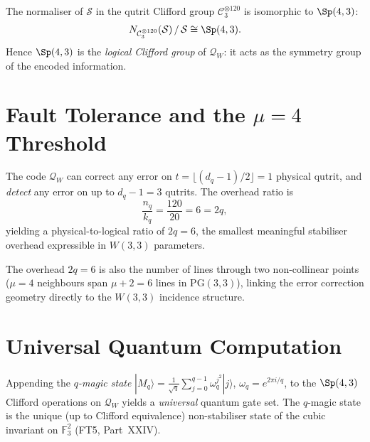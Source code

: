 \begin{theorem}[Stabiliser group $= \Sp(4,3)$]
\label{thm:stab_sp43}
The normaliser of $\mathcal{S}$ in the qutrit Clifford group
$\mathcal{C}_3^{\otimes 120}$ is isomorphic to $\Sp(4,3)$:
\begin{equation}
  N_{\mathcal{C}_3^{\otimes 120}}(\mathcal{S})
  \,/\,\mathcal{S}
  \cong \Sp(4,3).
  \label{eq:normaliser}
\end{equation}
Hence $\Sp(4,3)$ is the \emph{logical Clifford group} of
$\mathcal{Q}_W$: it acts as the symmetry group of the encoded
information.
\end{theorem}

\section{\texorpdfstring{Fault Tolerance and the $\mu=4$ Threshold}{Fault Tolerance and the mu=4 Threshold}}
\label{sec:fault_tolerance}

\begin{theorem}
\label{thm:fault_tol}
The code $\mathcal{Q}_W$ can correct any error on
$t=\lfloor(d_q-1)/2\rfloor = 1$ physical qutrit, and
\emph{detect} any error on up to $d_q-1=3$ qutrits.
The overhead ratio is
\begin{equation}
  \frac{n_q}{k_q} = \frac{120}{20} = 6 = 2q,
  \label{eq:overhead}
\end{equation}
yielding a physical-to-logical ratio of $2q=6$, the smallest
meaningful stabiliser overhead expressible in $W(3,3)$
parameters.
\end{theorem}

\begin{remark}
The overhead $2q=6$ is also the number of lines through two
non-collinear points ($\mu=4$ neighbours span
$\mu + 2 = 6$ lines in $\mathrm{PG}(3,3)$), linking the error
correction geometry directly to the $W(3,3)$ incidence structure.
\end{remark}

\section{Universal Quantum Computation}
\label{sec:uqc}

\begin{theorem}
\label{thm:uqc}
Appending the \emph{$q$-magic state}
$|M_q\rangle = \frac{1}{\sqrt{q}}\sum_{j=0}^{q-1}\omega_q^{j^2}|j\rangle$,
$\omega_q=e^{2\pi i/q}$, to the $\Sp(4,3)$ Clifford operations
on $\mathcal{Q}_W$ yields a \emph{universal} quantum gate set.
The $q$-magic state is the unique (up to Clifford equivalence)
non-stabiliser state of the cubic invariant on $\mathbb{F}_3^2$
(FT5, Part~XXIV).
\end{theorem}

